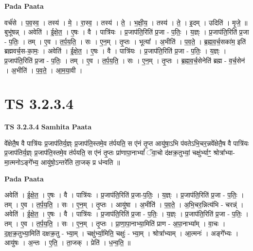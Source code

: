 \documentclass[17pt]{extarticle}
\begin{document}
\textbf{Pada Paata} \newline

वर्च॑से । प॒व॒स्व॒ । तस्य॑ । मे॒ । रा॒स्व॒ । तस्य॑ । ते॒ । भ॒क्षी॒य॒ । तस्य॑ । ते॒ । इ॒दम् । उदिति॑ । मृ॒जे॒ ॥ बुभू॑षन्न् । अवेति॑ । ई॒क्षे॒त॒ । ए॒षः । वै । पात्रि॑यः । प्र॒जाप॑ति॒रिति॑ प्र॒जा - प॒तिः॒ । य॒ज्ञ्ः । प्र॒जाप॑ति॒रिति॑ प्र॒जा - प॒तिः॒ । तम् । ए॒व । त॒र्प॒य॒ति॒ । सः । ए॒न॒म् । तृ॒प्तः । भूत्या᳚ । अ॒भीति॑ । प॒व॒ते॒ । ब्र॒ह्म॒व॒र्च॒सका॑म॒ इति॑ ब्रह्मवर्च॒स-का॒मः॒ । अवेति॑ । ई॒क्षे॒त॒ । ए॒षः । वै । पात्रि॑यः । प्र॒जाप॑ति॒रिति॑ प्र॒जा - प॒तिः॒ । य॒ज्ञ्ः । प्र॒जाप॑ति॒रिति॑ प्र॒जा - प॒तिः॒ । तम् । ए॒व । त॒र्प॒य॒ति॒ । सः । ए॒न॒म् । तृ॒प्तः । ब्र॒ह्म॒व॒र्च॒सेनेति॑ ब्रह्म - व॒र्च॒सेन॑ । अ॒भीति॑ । प॒व॒ते॒ । आ॒म॒या॒वी ।  \newline




\section*{ TS 3.2.3.4 }

\textbf{TS 3.2.3.4 } \newline
\textbf{Samhita Paata} \newline

वे᳚क्षेतै॒ष वै पात्रि॑यः प्र॒जाप॑तिर्य॒ज्ञ्ः प्र॒जाप॑ति॒स्तमे॒व त॑र्पयति॒ स ए॑नं तृ॒प्त आयु॑षा॒ऽभि प॑वतेऽभि॒चर॒न्नवे᳚क्षेतै॒ष वै पात्रि॑यः प्र॒जाप॑तिर्य॒ज्ञ्ः प्र॒जाप॑ति॒स्तमे॒व त॑र्पयति॒ स ए॑नं तृ॒प्तः प्रा॑णापा॒नाभ्यां᳚ ॅवा॒चो द॑क्षक्र॒तुभ्यां॒ चक्षु॑र्भ्याꣳ॒॒ श्रोत्रा᳚भ्या-मा॒त्मनोऽङ्गे᳚भ्य॒ आयु॑षो॒ऽन्तरे॑ति ता॒जक् प्र ध॑न्वति ॥ \newline

\textbf{Pada Paata} \newline

अवेति॑ । ई॒क्षे॒त॒ । ए॒षः । वै । पात्रि॑यः । प्र॒जाप॑ति॒रिति॑ प्र॒जा-प॒तिः॒ । य॒ज्ञ्ः । प्र॒जाप॑ति॒रिति॑ प्र॒जा - प॒तिः॒ । तम् । ए॒व । त॒र्प॒य॒ति॒ । सः । ए॒न॒म् । तृ॒प्तः । आयु॑षा । अ॒भीति॑ । प॒व॒ते॒ । अ॒भि॒चर॒न्नित्य॑भि - चरन्न्॑ । अवेति॑ । ई॒क्षे॒त॒ । ए॒षः । वै । पात्रि॑यः । प्र॒जाप॑ति॒रिति॑ प्र॒जा - प॒तिः॒ । य॒ज्ञ्ः । प्र॒जाप॑ति॒रिति॑ प्र॒जा - प॒तिः॒ । तम् । ए॒व । त॒र्प॒य॒ति॒ । सः । ए॒न॒म् । तृ॒प्तः । प्रा॒णा॒पा॒नाभ्या॒मिति॑ प्राण - अ॒पा॒नाभ्या᳚म् । वा॒चः । द॒क्ष॒क्र॒तुभ्या॒मिति॑ दक्षक्र॒तु - भ्या॒म् । चक्षु॑र्भ्या॒मिति॒ चक्षुः॑ - भ्या॒म् । श्रोत्रा᳚भ्याम् । आ॒त्मनः॑ । अङ्गे᳚भ्यः । आयु॑षः । अ॒न्तः । ए॒ति॒ । ता॒जक् । प्रेति॑ । ध॒न्व॒ति॒ ॥  \newline
\end{document}
